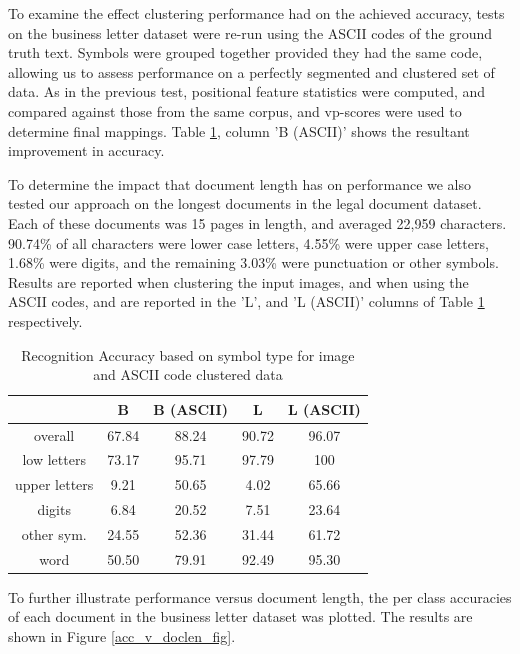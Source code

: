 \documentclass[times, 10pt,twocolumn]{article}
\begin{document}
To examine the effect clustering performance had on the achieved accuracy,
tests on the business letter dataset were re-run using the ASCII codes of the
ground truth text.  Symbols were grouped together provided they had the same
code, allowing us to assess performance on a perfectly segmented and clustered 
set of data.  As in the previous test, positional feature statistics were
computed, and compared against those from the same corpus, and vp-scores were
used to determine final mappings.  Table \ref{acc_tbl}, column 'B (ASCII)'
shows the resultant improvement in accuracy.

To determine the impact that document length has on performance we also tested 
our approach on the longest documents in the legal document dataset.  Each of 
these documents was 15 pages in length, and averaged 22,959 characters.
90.74\% of all characters were lower case letters, 4.55\% were upper case 
letters, 1.68\% were digits, and the remaining 3.03\% were punctuation or 
other symbols.  Results are reported when clustering the input images, and 
when using the ASCII codes, and are reported in the 'L', and 'L (ASCII)' 
columns of Table \ref{acc_tbl} respectively.

\begin{table}[ht]
  \begin{tabular}{|c|c|c|c|c|}
    \hline
    & B & B (ASCII) & L & L (ASCII)\\
    \hline
    \hline
    overall & 67.84 & 88.24 & 90.72 & 96.07\\
    \hline
    low letters & 73.17 & 95.71 & 97.79 & 100\\
    \hline
    upper letters & 9.21 & 50.65 & 4.02 & 65.66\\
    \hline
    digits & 6.84 & 20.52 & 7.51 & 23.64\\
    \hline
    other sym. & 24.55 & 52.36 & 31.44 & 61.72\\
    \hline
    word & 50.50 & 79.91 & 92.49 & 95.30\\
    \hline
  \end{tabular}
  \caption{Recognition Accuracy based on symbol type for image and ASCII code
           clustered data}
  \label{acc_tbl}
\end{table}

To further illustrate performance versus document length, the per class
accuracies of each document in the business letter dataset was plotted.  The
results are shown in Figure \ref{acc_v_doclen_fig}.
\end{document}

